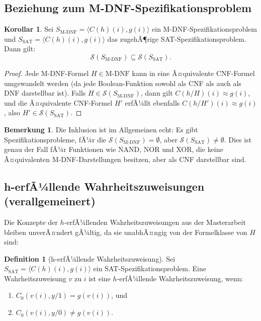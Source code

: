 ﻿\documentclass[a4paper,12pt]{article}
\theoremstyle{definition}
\newtheorem{definition}{Definition}
\newtheorem{korollar}{Korollar}
\newtheorem{bemerkung}{Bemerkung}
\begin{document}
\subsection{Beziehung zum M-DNF-Spezifikationsproblem}

\begin{korollar}
    Sei $S_{\text{M-DNF}} = \langle C(h)(i), g(i) \rangle$ ein M-DNF-Spezifikationsproblem und $S_{\text{SAT}} = \langle C(h)(i), g(i) \rangle$ das zugehÃ¶rige SAT-Spezifikationsproblem. Dann gilt:
    \[
    \mathcal{S}(S_{\text{M-DNF}}) \subseteq \mathcal{S}(S_{\text{SAT}}).
    \]
\end{korollar}

\begin{proof}
    Jede M-DNF-Formel $H \in \text{M-DNF}$ kann in eine Ã¤quivalente CNF-Formel umgewandelt werden (da jede Boolean-Funktion sowohl als CNF als auch als DNF darstellbar ist). Falls $H \in \mathcal{S}(S_{\text{M-DNF}})$, dann gilt $C(h/H)(i) \approx g(i)$, und die Ã¤quivalente CNF-Formel $H'$ erfÃ¼llt ebenfalls $C(h/H')(i) \approx g(i)$, also $H' \in \mathcal{S}(S_{\text{SAT}})$.
\end{proof}

\begin{bemerkung}
    Die Inklusion ist im Allgemeinen echt: Es gibt Spezifikationsprobleme, fÃ¼r die $\mathcal{S}(S_{\text{M-DNF}}) = \emptyset$, aber $\mathcal{S}(S_{\text{SAT}}) \neq \emptyset$. Dies ist genau der Fall fÃ¼r Funktionen wie NAND, NOR und XOR, die keine Ã¤quivalenten M-DNF-Darstellungen besitzen, aber als CNF darstellbar sind.
\end{bemerkung}

\subsection{h-erfÃ¼llende Wahrheitszuweisungen (verallgemeinert)}

Die Konzepte der $h$-erfÃ¼llenden Wahrheitszuweisungen aus der Masterarbeit bleiben unverÃ¤ndert gÃ¼ltig, da sie unabhÃ¤ngig von der Formelklasse von $H$ sind:

\begin{definition}[h-erfÃ¼llende Wahrheitszuweisung]
    Sei $S_{\text{SAT}} = \langle C(h)(i), g(i) \rangle$ ein SAT-Spezifikationsproblem. Eine Wahrheitszuweisung $v$ zu $i$ ist eine $h$-erfÃ¼llende Wahrheitszuweisung, wenn:
    \begin{enumerate}
        \item $C_0(v(i), y/1) = g(v(i))$, und
        \item $C_0(v(i), y/0) \neq g(v(i))$.
    \end{enumerate}
\end{definition}
\end{document}
